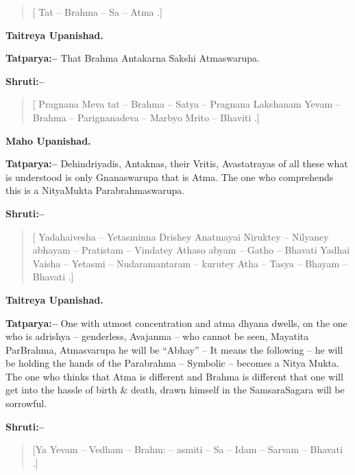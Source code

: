 \begin{verse}
[ Tat – Brahma – Sa – Atma .]
\end{verse}

\begin{flushright}
\textbf{Taitreya Upanishad.}
\end{flushright}

\textbf{Tatparya:–} That Brahma Antakarna Sakshi Atmaswarupa.

\textbf{Shruti:–}

\begin{verse}
[ Pragnana Meva tat – Brahma – Satya – Pragnana Lakshanam  Yevam – Brahma – Parignanadeva – Marbyo Mrito – Bhaviti .]
\end{verse}

\begin{flushright}
\textbf{Maho Upanishad.}
\end{flushright}

\textbf{Tatparya:–} Dehindriyadis, Antaknas, their Vritis, Avastatrayas of all these what is understood is only Gnanaswarupa that is Atma. The one who comprehends this is a NityaMukta Parabrahmaswarupa.

\textbf{Shruti:–}

\begin{verse}
[ Yadahaivesha – Yetasminna Drishey Anatmayai Niruktey – Nilyaney abhayam – Pratistam – Vindatey  Athaso abyam – Gatho – Bhavati  Yadhai Vaisha – Yetasmi – Nudaramantaram – kurutey Atha – Tasya – Bhayam – Bhavati .]
\end{verse}

\begin{flushright}
\textbf{Taitreya Upanishad.}
\end{flushright}

\textbf{Tatparya:–} One with utmost concentration and atma dhyana dwells, on the one who is adrishya – genderless, Avajanma – who cannot be seen, Mayatita ParBrahma, Atmasvarupa he will be “Abhay” – It means the following – he will be holding the hands of the Parabrahma – Symbolic – becomes a Nitya Mukta. The one who thinks that Atma is different and Brahma is different that one will get into the hassle of birth \& death, drawn himself in the SamsaraSagara will be sorrowful.

\textbf{Shruti:–}

\begin{verse}
[Ya Yevam – Vedham – Brahm: – asmiti – Sa – Idam – Sarvam – Bhavati .]
\end{verse}

